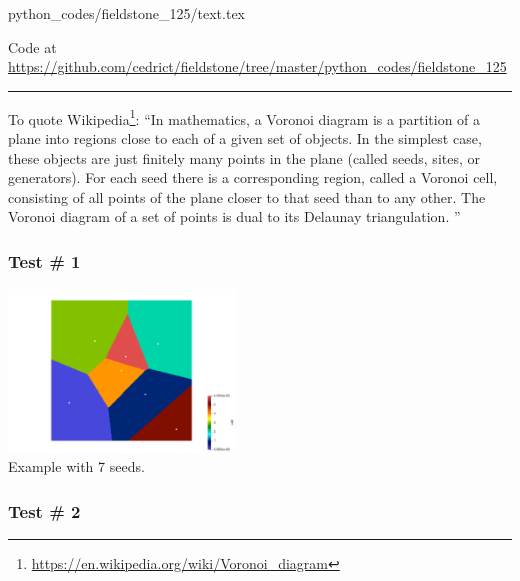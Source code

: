 \begin{flushright} {\tiny {\color{gray} python\_codes/fieldstone\_125/text.tex}} \end{flushright}

%

\begin{center}

Code at \url{https://github.com/cedrict/fieldstone/tree/master/python_codes/fieldstone_125}
\end{center}

\par\noindent\rule{\textwidth}{0.4pt}



To quote Wikipedia\footnote{\url{https://en.wikipedia.org/wiki/Voronoi_diagram}}:
``In mathematics, a Voronoi diagram is a partition of a plane into regions close to each of a given set of objects. 
In the simplest case, these objects are just finitely many points in the plane (called seeds, sites, or generators). 
For each seed there is a corresponding region, called a Voronoi cell, consisting of all points of the plane closer to 
that seed than to any other. The Voronoi diagram of a set of points is dual to its Delaunay triangulation. ''

\subsubsection*{Test \# 1}

\begin{center}
\includegraphics[width=6cm]{python_codes/fieldstone_125/results/diagram.png}\\
{\captionfont Example with 7 seeds.}
\end{center}


\subsubsection*{Test \# 2}

